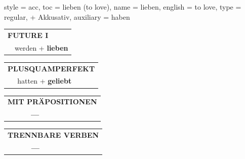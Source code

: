 \begin{verbentry}{
  style = {acc},
  toc = {lieben (to love)},
  name = {lieben},
  english = {to love},
  type = {regular, + Akkusativ},
  auxiliary = {haben}
}
\begin{tabular}{rl}
    \multicolumn{2}{l}{\textbf{FUTURE I} }\\
   & werden + \textbf{lieben}\\
 
  \end{tabular}
\hfill
   \begin{tabular}{rl}
      \multicolumn{2}{l}{\textbf{PLUSQUAMPERFEKT}}\\
   & hatten + \textbf{geliebt}\\
  \end{tabular}
  
  
\vspace{10pt}

\begin{tabular}{lll}
\multicolumn{3}{l}{\textbf{MIT PRÄPOSITIONEN}}\\
& \textbf{---} & \\
\end{tabular}
\hfill
\begin{tabular}{lll}
\multicolumn{3}{l}{\textbf{TRENNBARE VERBEN}}\\
& \textbf{---} & \\
\end{tabular}
\vspace{-5pt}
\end{verbentry}

